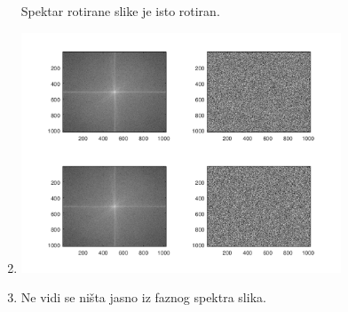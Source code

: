 \documentclass[12pt, a4]{report}
\begin{document}
\begin{enumerate}
\begin{minipage}{\linewidth}
                    \end{minipage}
                    Spektar rotirane slike je isto rotiran.
                \item
                    \begin{minipage}{\linewidth}
                        \centering
                        \includegraphics[width=0.75\textwidth]{klis_translated}
                    \end{minipage}
                \item
                    Ne vidi se ništa jasno iz faznog spektra slika.
            \end{enumerate}
\end{document}
